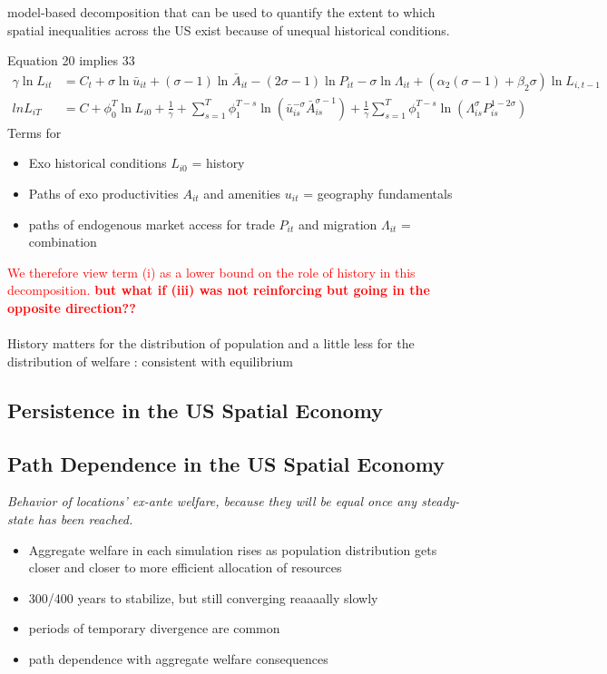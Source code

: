 \documentclass[10pt, final]{article}
\begin{document}
model-based decomposition that can be used to quantify the extent to which spatial inequalities across the US exist because of unequal historical conditions.

Equation 20 implies 33
\begin{align*}
    \gamma \ln L_{it} &= C_t + \sigma \ln \bar{u}_{it} + (\sigma - 1) \ln \bar{A}_{it} - (2 \sigma - 1) \ln P_{it} - \sigma \ln \Lambda_{it} + (\alpha_2 (\sigma - 1) + \beta_2 \sigma) \ln L_{i,t-1} \\
    ln L_{iT} &= C + \phi_0^T \ln L_{i0} + \frac{1}{\gamma} + \sum_{s=1}^T \phi_1^{T-s} \ln (\bar{u}_{is}^{-\sigma} \bar{A}_{is}^{\sigma-1}) + \frac{1}{\gamma} \sum_{s=1}^{T} \phi_1^{T-s} \ln (\Lambda_{is}^\sigma P_{is}^{1-2\sigma})
\end{align*}
Terms for
\begin{itemize}
    \item Exo historical conditions $L_{i0}$ = history
    \item Paths of exo productivities $A_{it}$ and amenities $u_{it}$ = geography fundamentals
    \item paths of endogenous market access for trade $P_{it}$ and migration $\Lambda_{it}$ = combination
\end{itemize}
\textcolor{red}{We therefore view term (i) as a lower bound on the role of history in this decomposition. \textbf{but what if (iii) was not reinforcing but going in the opposite direction??}}
\\
\\
History matters for the distribution of population and a little less for the distribution of welfare : consistent with equilibrium


\subsection*{Persistence in the US Spatial Economy} %
\label{sub:persistence_in_the_us_spatial_economy}



\subsection{Path Dependence in the US Spatial Economy} %
\label{sub:path_dependence_in_the_us_spatial_economy}

\textit{Behavior of locations' ex-ante welfare, because they will be equal once any steady-state has been reached.}

\begin{itemize}
    \item Aggregate welfare in each simulation rises as population distribution gets closer and closer to more efficient allocation of resources
    \item 300/400 years to stabilize, but still converging reaaaally slowly
    \item periods of temporary divergence are common
    \item path dependence with aggregate welfare consequences
\end{itemize}
\end{document}
